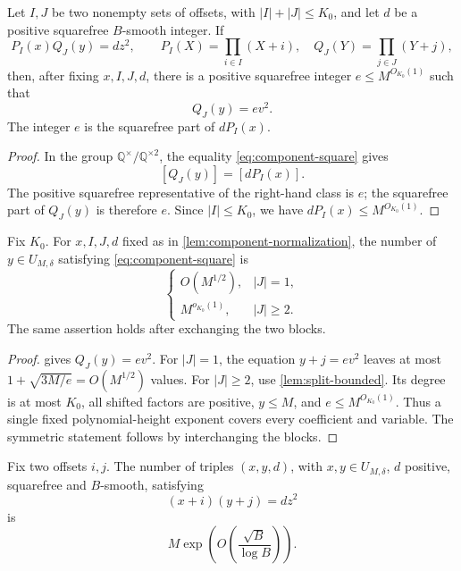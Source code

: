 \begin{lemma}\label{lem:component-normalization}
Let $I,J$ be two nonempty sets of offsets, with $|I|+|J|\le K_0$, and let $d$ be a positive squarefree $B$-smooth integer. If
\begin{equation}\label{eq:component-square}
 P_I(x)Q_J(y)=dz^2,
 \qquad
 P_I(X)=\prod_{i\in I}(X+i),
 \quad
 Q_J(Y)=\prod_{j\in J}(Y+j),
\end{equation}
then, after fixing $x,I,J,d$, there is a positive squarefree integer $e\le M^{O_{K_0}(1)}$ such that
\begin{equation}\label{eq:normalized-mobile}
 Q_J(y)=ev^2.
\end{equation}
The integer $e$ is the squarefree part of $dP_I(x)$.
\end{lemma}

\begin{proof}
In the group $\mathbb Q^\times/\mathbb Q^{\times2}$, the equality \eqref{eq:component-square} gives
\[
 [Q_J(y)]=[dP_I(x)].
\]
The positive squarefree representative of the right-hand class is $e$; the squarefree part of $Q_J(y)$ is therefore $e$. Since $|I|\le K_0$, we have $dP_I(x)\le M^{O_{K_0}(1)}$.
\end{proof}
\begin{lemma}\label{lem:one-sided-component}
Fix $K_0$. For $x,I,J,d$ fixed as in \cref{lem:component-normalization}, the number of $y\in U_{M,\delta}$ satisfying \eqref{eq:component-square} is
\[
 \begin{cases}
 O(M^{1/2}),&|J|=1,\\
 M^{o_{K_0}(1)},&|J|\ge2.
 \end{cases}
\]
The same assertion holds after exchanging the two blocks.
\end{lemma}

\begin{proof}
 gives $Q_J(y)=ev^2$.
For $|J|=1$, the equation $y+j=ev^2$ leaves at most
$1+\sqrt{3M/e}=O(M^{1/2})$ values.
For $|J|\ge2$, use \cref{lem:split-bounded}. Its degree is at most
$K_0$, all shifted factors are positive, $y\le M$, and
$e\le M^{O_{K_0}(1)}$. Thus a single fixed polynomial-height exponent
covers every coefficient and variable. The symmetric statement follows
by interchanging the blocks.
\end{proof}
\begin{lemma}\label{lem:singleton-pair}
Fix two offsets $i,j$. The number of triples $(x,y,d)$, with $x,y\in U_{M,\delta}$, $d$ positive, squarefree and $B$-smooth, satisfying
\[
 (x+i)(y+j)=dz^2
\]
is
\begin{equation}\label{eq:size2-hosts}
 M\exp\!\left(O\!\left(\frac{\sqrt B}{\log B}\right)\right).
\end{equation}
\end{lemma}

